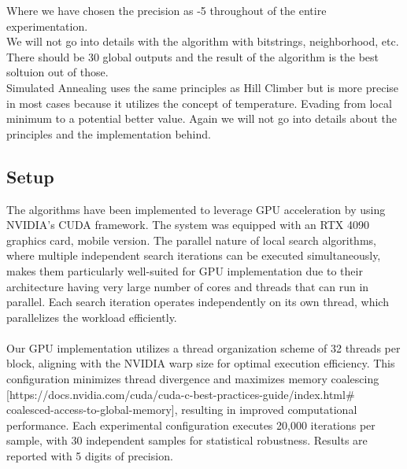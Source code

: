 \documentclass{article}
\begin{document}
Where we have chosen the precision as -5 throughout of the entire experimentation.\\
We will not go into details with the algorithm with bitstrings, neighborhood, etc. 
There should be 30 global outputs and the result of the algorithm is the best soltuion out of those. \\ 

Simulated Annealing uses the same principles as Hill Climber but is more precise in most cases because it utilizes the concept of temperature. Evading from local minimum to a potential better value.
Again we will not go into details about the principles and the implementation behind.

\subsection{Setup}
The algorithms have been implemented to leverage GPU acceleration by using NVIDIA's CUDA framework. The system was equipped with an RTX 4090 graphics card, mobile version. The parallel nature of local search algorithms, where multiple independent search iterations can be executed simultaneously, makes them particularly well-suited for GPU implementation due to their architecture having very large number of cores and threads that can run in parallel. Each search iteration operates independently on its own thread, which parallelizes the workload efficiently. \\ \\
Our GPU implementation utilizes a thread organization scheme of 32 threads per block, aligning with the NVIDIA warp size for optimal execution efficiency. This configuration minimizes thread divergence and maximizes memory coalescing [https://docs.nvidia.com/cuda/cuda-c-best-practices-guide/index.html\# coalesced-access-to-global-memory], resulting in improved computational performance. Each experimental configuration executes 20,000 iterations per sample, with 30 independent samples for statistical robustness. Results are reported with 5 digits of precision.
\end{document}
